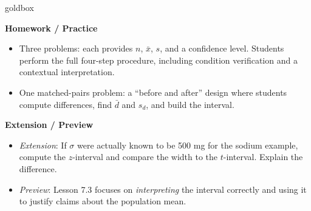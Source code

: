 \documentclass[10pt]{article}
\begin{document}
\begin{skillbox}{goldbox}
\begin{minipage}[t]{0.48\linewidth}
    \textbf{Homework / Practice}
    \begin{itemize}
        \item Three problems: each provides $n$, $\bar x$, $s$, and a confidence
              level. Students perform the full four-step procedure, including condition
              verification and a contextual interpretation.
        \item One matched-pairs problem: a ``before and after'' design where students
              compute differences, find $\bar d$ and $s_d$, and build the interval.
    \end{itemize}
\end{minipage}
\hfill
\begin{minipage}[t]{0.48\linewidth}
    \textbf{Extension / Preview}
    \begin{itemize}
        \item \textit{Extension}: If $\sigma$ were actually known to be 500 mg for
              the sodium example, compute the $z$-interval and compare the width to
              the $t$-interval. Explain the difference.
        \item \textit{Preview}: Lesson 7.3 focuses on \emph{interpreting} the interval
              correctly and using it to justify claims about the population mean.
    \end{itemize}
\end{minipage}
\end{skillbox}
\end{document}
